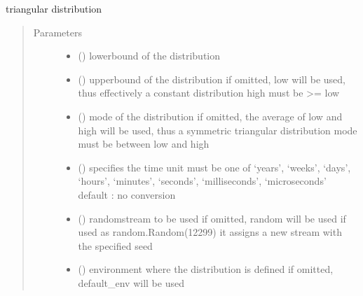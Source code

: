 \documentclass[letterpaper,10pt,english]{sphinxmanual}
\begin{document}

\begin{fulllineitems}
\label{\detokenize{Reference:salabim.Triangular}}
triangular distribution
\begin{quote}\begin{description}
\item[{Parameters}] \leavevmode\begin{itemize}
\item {} 
 () \textendash{} lowerbound of the distribution

\item {} 
 () \textendash{} upperbound of the distribution 
if omitted, low will be used, thus effectively a constant distribution 
high must be \textgreater{}= low

\item {} 
 () \textendash{} mode of the distribution 
if omitted, the average of low and high will be used, thus a symmetric triangular distribution 
mode must be between low and high

\item {} 
 () \textendash{} specifies the time unit 
must be one of ‘years’, ‘weeks’, ‘days’, ‘hours’, ‘minutes’, ‘seconds’, ‘milliseconds’, ‘microseconds’ 
default : no conversion 

\item {} 
 () \textendash{} randomstream to be used 
if omitted, random will be used 
if used as random.Random(12299)
it assigns a new stream with the specified seed

\item {} 
 ({\hyperref[\detokenize{Reference:salabim.Environment}]{}}) \textendash{} environment where the distribution is defined 
if omitted, default\_env will be used


\end{itemize}
\end{description}
\end{quote}
\end{fulllineitems}
\end{document}
